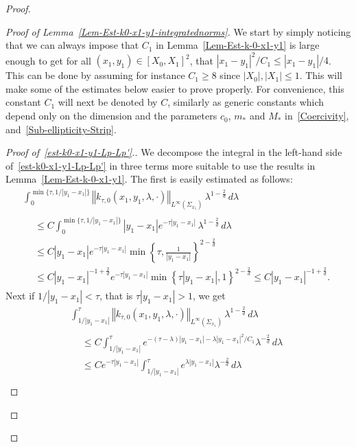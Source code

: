 \documentclass[10pt]{amsart}
\theoremstyle{definition}\newtheorem{defi}[theo]{Definition}\newtheorem{rema}[theo]{Remark}\newtheorem{exam}[theo]{Example}\newtheorem{exem}[theo]{Example}\newtheorem{nota}[theo]{Notation}
\newcommand{\norm}[1]{\left\Vert#1\right\Vert}
\renewcommand{\leq}{\leqslant}
\renewcommand{\geq}{\geqslant}
\begin{document}
\begin{proof}
\begin{proof}[Proof of Lemma~\ref{Lem-Est-k0-x1-y1-integratednorms}]
We start by simply noticing that we can always impose that $C_1$ in Lemma~\ref{Lem-Est-k-0-x1-y1} is large enough to get for all $(x_1, y_1) \in [X_0, X_1]^2$, that $|x_1 - y_1|^2/C_1 \leq |x_1 - y_1|/4$. This can be done by assuming for instance $C_1 \geq 8$ since $|X_0|, |X_1| \leq 1$. This will make some of the estimates below easier to prove properly. For convenience, this constant $C_1$ will next be denoted by $C$, similarly as generic constants which depend only on the dimension and the parameters $c_0$, $m_*$ and $M_*$ in~\eqref{Coercivity}, and~\eqref{Sub-ellipticity-Strip}.

\begin{proof}[{Proof of~\eqref{est-k0-x1-y1-Lp-Lp'}.}]
We decompose the integral in the left-hand side of~\eqref{est-k0-x1-y1-Lp-Lp'} in three terms more suitable to use the results in Lemma~\ref{Lem-Est-k-0-x1-y1}. The first is easily estimated as follows:
\begin{multline*}
\int_{0}^{ \min\{ \tau, 1/|y_1-x_1|\} } \norm{k_{\tau,0}(x_1, y_1, \lambda, \cdot) }_{L^\infty\left(\Sigma_{x_1}\right)} \, \lambda^{1 -\frac{2}{d}}\, d\lambda\\
\begin{aligned}
& \leq C \int_{0}^{ \min\{ \tau, 1/|y_1-x_1|\} } |y_1-x_1| e^{-\tau |y_1 -x_1|} \, \lambda^{1 -\frac{2}{d}}\, d\lambda
\\
&
\leq C |y_1-x_1| e^{-\tau |y_1 -x_1|} \min\left\{ \tau, \frac{1}{|y_1-x_1|}\right\}^{2 - \frac{2}{d}}
\\
&
\leq C |y_1-x_1|^{-1+\frac{2}{d}} e^{-\tau |y_1 -x_1|} \min\left\{ \tau |y_1 -x_1|, 1\right\}^{2 - \frac{2}{d}}
\leq C |y_1-x_1|^{-1+\frac{2}{d}}.
\end{aligned}
\end{multline*}
Next if $1/|y_1 -x _1| < \tau$, that is $\tau |y_1 - x_1| > 1$, we get
\begin{multline*}
\int_{ 1/|y_1-x_1|}^{ \tau } \norm{k_{\tau,0}(x_1, y_1, \lambda, \cdot) }_{L^\infty\left(\Sigma_{x_1}\right)} \, \lambda^{1 -\frac{2}{d}}\, d\lambda \\
\begin{aligned}
&\leq C \int_{ 1/|y_1-x_1|}^{ \tau } e^{-(\tau - \lambda)|y_1 -x_1|- \lambda |y_1-x_1|^2/C_1} \lambda^{ -\frac{2}{d}}\, d\lambda
\\
& \leq C e^{-\tau |y_1-x_1|}\int_{1/|y_1 -x_1|}^{\tau} e^{\lambda |y_1-x_1|} \lambda^{-\frac{2}{d}} \, d \lambda
\\

\end{aligned}
\end{multline*}
\end{proof}
\end{proof}
\end{proof}
\end{document}
